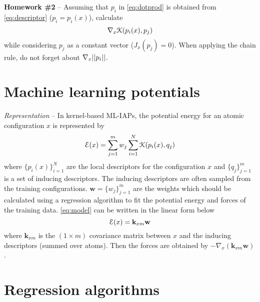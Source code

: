 \documentclass[12pt]{article}
\DeclarePairedDelimiter\norm{||}{||}
\newcommand{\des}{p}
\newcommand{\indu}{q}
\newcommand{\gradients}{{\nabla}}
\newcommand{\jacobian}{J}
\newcommand{\kernel}{\EuScript{K}}
\newcommand{\energy}{\EuScript{E}}
\begin{document}
\textbf{Homework \#2} --
Assuming that $\des_i$ in \autoref{eq:dotprod} is obtained
from \autoref{eq:descriptor} ($\des_i=\des_i(x)$), calculate
$$\gradients_x \kernel(\des_i(x), \des_j)$$
while considering $\des_j$ as a constant vector
($\jacobian_x(\des_j)=0$).
When applying the chain rule, do not forget about
$\gradients_x \norm{\des_i}$.


\section{Machine learning potentials}\label{sec:model}

\emph{Representation} --
In kernel-based ML-IAPs, the potential energy for
an atomic configuration $x$ is represented by
\begin{equation}\label{eq:model}
    \energy(x) =
        \sum_{j=1}^{m}
            w_j
            \sum_{i=1}^{N}
                \kernel(\des_i(x), \indu_j)
\end{equation}
where $\{\des_i(x)\}_{i=1}^N$ are the local descriptors
for the configuration $x$ and $\{\indu_j\}_{j=1}^m$
is a set of inducing descriptors.
The inducing descriptors are often sampled from the
training configurations.
$\mathbf{w}=\{w_j\}_{j=1}^m$ are the weights which should
be calculated using a regression algorithm to fit the
potential energy and forces of the training data.
\autoref{eq:model} can be written in the linear form below
\begin{equation}\label{eq:model2}
    \energy(x) = \mathbf{k}_{x m}\mathbf{w}
\end{equation}
where $\mathbf{k}_{x m}$ is the $(1\times m)$ covariance matrix
between $x$ and the inducing descriptors (summed over atoms).
Then the forces are obtained by
$-\gradients_x (\mathbf{k}_{x m}\mathbf{w})$.


\section{Regression algorithms}\label{sec:regression}
\end{document}
